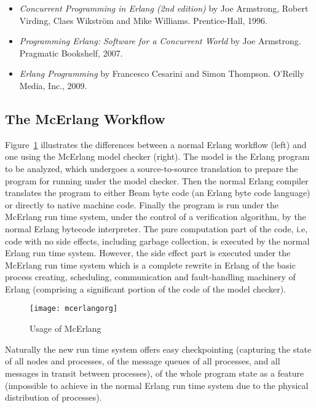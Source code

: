 \documentclass[a4paper]{article}
\begin{document}
\begin{itemize}
\item
{\em Concurrent Programming in Erlang (2nd edition)}
by Joe Armstrong, Robert Virding, Claes Wikstr{\"om}
and Mike Williams.
Prentice-Hall, 1996.
\item
{\em Programming Erlang: Software for a Concurrent World }
by Joe Armstrong. Pragmatic Bookshelf, 2007.
\item
{\em Erlang Programming}
by Francesco Cesarini and Simon Thompson.
O'Reilly Media, Inc., 2009.
\end{itemize}


\subsection{The McErlang Workflow}

Figure~\ref{fig:workflow} illustrates the differences between
a normal Erlang workflow (left) and one using the McErlang model 
checker (right). The model is the Erlang program to be analyzed, which undergoes
a source-to-source translation to prepare the program for running under
the model checker. Then the normal Erlang compiler translates
the program to either Beam byte code (an Erlang byte code language)
or directly to native machine code. Finally the program
is run under the McErlang run time system, under the control
of a verification algorithm, by the normal Erlang bytecode
interpreter. The pure computation part of the code, i.e, code with no 
side effects, including garbage collection,
is executed by the normal Erlang run time system. However, the side effect part
is executed under the McErlang run time system which is a complete
rewrite in Erlang of the basic process creating, scheduling,
communication and fault-handling machinery of Erlang (comprising a 
significant portion of the code of the model checker). 

\begin{figure}
\centering
\texttt{[image: mcerlangorg]}
\caption{Usage of McErlang}
\label{fig:workflow}
\end{figure}

Naturally the new run time system
offers easy checkpointing (capturing the state of all nodes and processes,
of the message queues of all processes, and all messages in
transit between processes), of the whole program state as a feature
(impossible to achieve in the normal Erlang run time system due to
the physical distribution of processes).
\end{document}
